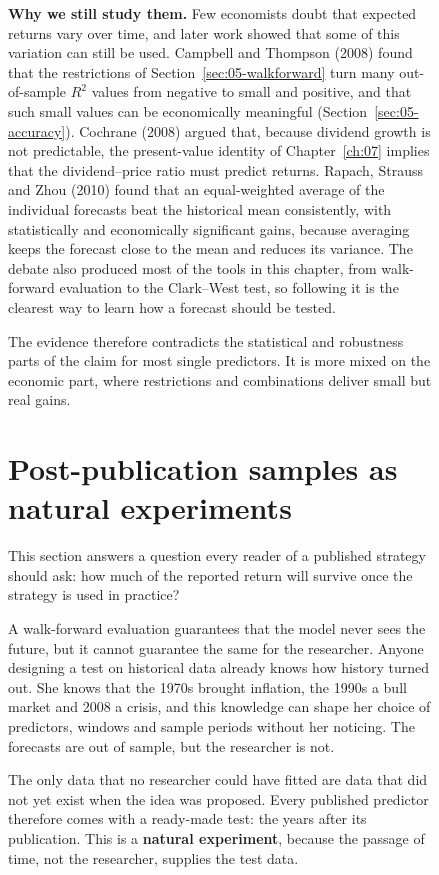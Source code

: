 \begin{figure}[htbp]
\textbf{Why we still study them.} Few economists doubt that expected returns vary over time, and later work showed that some of this variation can still be used. Campbell and Thompson (2008) found that the restrictions of Section~\ref{sec:05-walkforward} turn many out-of-sample $R^2$ values from negative to small and positive, and that such small values can be economically meaningful (Section~\ref{sec:05-accuracy}). Cochrane (2008) argued that, because dividend growth is not predictable, the present-value identity of Chapter~\ref{ch:07} implies that the dividend--price ratio must predict returns. Rapach, Strauss and Zhou (2010) found that an equal-weighted average of the individual forecasts beat the historical mean consistently, with statistically and economically significant gains, because averaging keeps the forecast close to the mean and reduces its variance. The debate also produced most of the tools in this chapter, from walk-forward evaluation to the Clark--West test, so following it is the clearest way to learn how a forecast should be tested.

The evidence therefore contradicts the statistical and robustness parts of the claim for most single predictors. It is more mixed on the economic part, where restrictions and combinations deliver small but real gains.

\section{Post-publication samples as natural experiments}
\label{sec:05-postpub}

This section answers a question every reader of a published strategy should ask: how much of the reported return will survive once the strategy is used in practice?

A walk-forward evaluation guarantees that the model never sees the future, but it cannot guarantee the same for the researcher. Anyone designing a test on historical data already knows how history turned out. She knows that the 1970s brought inflation, the 1990s a bull market and 2008 a crisis, and this knowledge can shape her choice of predictors, windows and sample periods without her noticing. The forecasts are out of sample, but the researcher is not.

The only data that no researcher could have fitted are data that did not yet exist when the idea was proposed. Every published predictor therefore comes with a ready-made test: the years after its publication. This is a \textbf{natural experiment}, because the passage of time, not the researcher, supplies the test data.


\end{figure}
